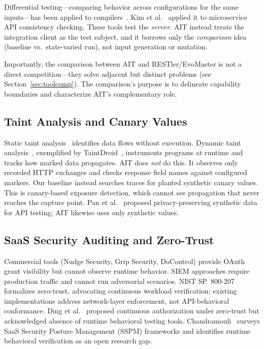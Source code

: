 \documentclass[conference]{IEEEtran}
\begin{document}
Differential testing---comparing behavior across configurations for the
same inputs---has been applied to compilers~\cite{yang2011}.
Kim et al.~\cite{kim2022} applied it to microservice API consistency
checking. These tools test the \emph{server}. AIT instead treats the
integration client as the test subject, and it borrows only the
\emph{comparison} idea (baseline vs.\ state-varied run), not input
generation or mutation.

Importantly, the comparison between AIT and RESTler/EvoMaster is not a
direct competition---they solve adjacent but distinct problems (see
Section~\ref{sec:toolcomp}). The comparison's purpose is to delineate
capability boundaries and characterize AIT's complementary role.

\subsection{Taint Analysis and Canary Values}

Static taint analysis~\cite{livshits2005} identifies data flows without
execution. Dynamic taint analysis~\cite{clause2007}, exemplified by
TaintDroid~\cite{enck2014}, instruments programs at runtime and tracks
how marked data propagates. AIT does \emph{not} do this. It observes
only recorded HTTP exchanges and checks response field names against
configured markers. Our baseline instead searches traces for planted
synthetic canary values. This is canary-based exposure detection, which
cannot see propagation that never reaches the capture point. Pan et
al.~\cite{pan2022} proposed privacy-preserving synthetic data for API
testing; AIT likewise uses only synthetic values.

\subsection{SaaS Security Auditing and Zero-Trust}

Commercial tools (Nudge Security, Grip Security, DoControl) provide
OAuth grant visibility but cannot observe runtime behavior. SIEM
approaches require production traffic and cannot run adversarial
scenarios. NIST SP~800-207~\cite{nist_zt2020} formalizes zero-trust,
advocating continuous workload verification; existing implementations
address network-layer enforcement, not API-behavioral conformance.
Ding et al.~\cite{ding2023} proposed continuous authorization under
zero-trust but acknowledged absence of runtime behavioral testing
tools.
Chandramouli~\cite{chandramouli2023} surveys SaaS Security Posture
Management (SSPM) frameworks and identifies runtime behavioral
verification as an open research gap.
\end{document}
